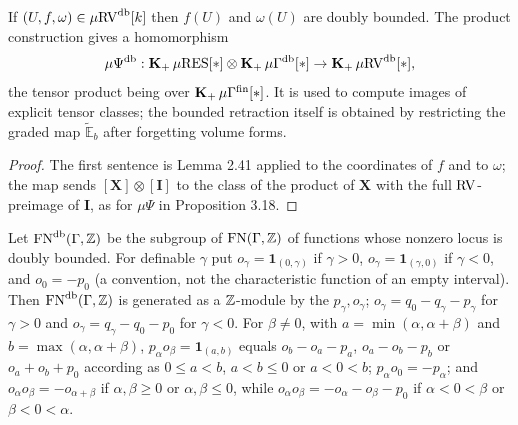 \setcounter{theorem}{9}
\begin{remark}
\label{tensor-bd}
\leanok
{}
If $(U, f, \omega) \in \mu\mathrm{RV}^{\operatorname{db}}[k]$ then $f(U)$ and $\omega(U)$ are doubly bounded. The product construction gives a homomorphism \[ \mu\Psi^{\operatorname{db}} : \operatorname{\mathbf{K}_+} \mu\mathrm{RES}[*] \otimes \operatorname{\mathbf{K}_+} \mu\Gamma^{\operatorname{db}}[*] \to \operatorname{\mathbf{K}_+} \mu\mathrm{RV}^{\operatorname{db}}[*], \] the tensor product being over $\operatorname{\mathbf{K}_+} \mu\Gamma^{\mathrm{fin}}[*]$. It is used to compute images of explicit tensor classes; the bounded retraction itself is obtained by restricting the graded map $\widetilde{\mathbb{E}}_b$ after forgetting volume forms.
\end{remark}

\begin{proof}
\leanok
The first sentence is Lemma 2.41 applied to the coordinates of $f$ and to $\omega$; the map sends $[\mathbf{X}] \otimes [\mathbf{I}]$ to the class of the product of $\mathbf{X}$ with the full $\mathrm{RV}$-preimage of $\mathbf{I}$, as for $\mu\Psi$ in Proposition 3.18.
\end{proof}

\setcounter{theorem}{10}
\begin{definition}
\label{db-generator}
\leanok
{}
Let $\operatorname{FN}^{\operatorname{db}}(\Gamma, \mathbb{Z})$ be the subgroup of $\operatorname{FN}(\Gamma, \mathbb{Z})$ of functions whose nonzero locus is doubly bounded. For definable $\gamma$ put $o_\gamma = \mathbf{1}_{(0, \gamma)}$ if $\gamma > 0$, $o_\gamma = \mathbf{1}_{(\gamma, 0)}$ if $\gamma < 0$, and $o_0 = -p_0$ (a convention, not the characteristic function of an empty interval). Then $\operatorname{FN}^{\operatorname{db}}(\Gamma, \mathbb{Z})$ is generated as a $\mathbb{Z}$-module by the $p_\gamma, o_\gamma$; $o_\gamma = q_0 - q_\gamma - p_\gamma$ for $\gamma > 0$ and $o_\gamma = q_\gamma - q_0 - p_0$ for $\gamma < 0$. For $\beta \neq 0$, with $a = \min(\alpha, \alpha + \beta)$ and $b = \max(\alpha, \alpha + \beta)$, $p_\alpha o_\beta = \mathbf{1}_{(a, b)}$ equals $o_b - o_a - p_a$, $o_a - o_b - p_b$ or $o_a + o_b + p_0$ according as $0 \leq a < b$, $a < b \leq 0$ or $a < 0 < b$; $p_\alpha o_0 = -p_\alpha$; and $o_\alpha o_\beta = -o_{\alpha + \beta}$ if $\alpha, \beta \geq 0$ or $\alpha, \beta \leq 0$, while $o_\alpha o_\beta = -o_\alpha - o_\beta - p_0$ if $\alpha < 0 < \beta$ or $\beta < 0 < \alpha$.
\end{definition}

